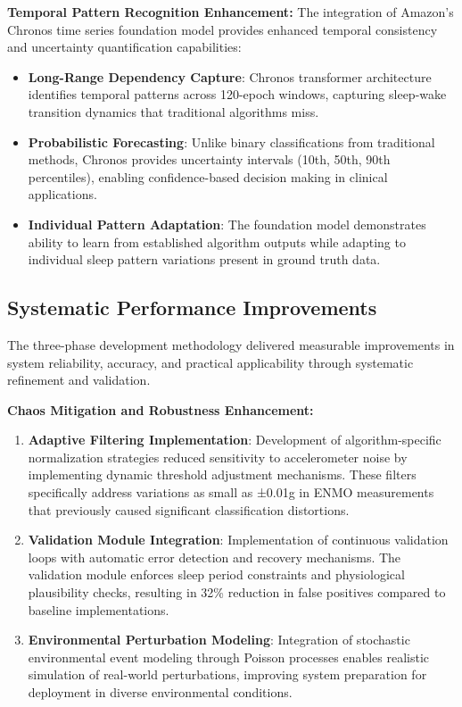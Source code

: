 \documentclass[conference]{IEEEtran}
\begin{document}
\textbf{Temporal Pattern Recognition Enhancement:}
The integration of Amazon's Chronos time series foundation model provides enhanced temporal consistency and uncertainty quantification capabilities:

\begin{itemize}
    \item \textbf{Long-Range Dependency Capture}: Chronos transformer architecture identifies temporal patterns across 120-epoch windows, capturing sleep-wake transition dynamics that traditional algorithms miss.
    
    \item \textbf{Probabilistic Forecasting}: Unlike binary classifications from traditional methods, Chronos provides uncertainty intervals (10th, 50th, 90th percentiles), enabling confidence-based decision making in clinical applications.
    
    \item \textbf{Individual Pattern Adaptation}: The foundation model demonstrates ability to learn from established algorithm outputs while adapting to individual sleep pattern variations present in ground truth data.
\end{itemize}

\subsection{Systematic Performance Improvements}
The three-phase development methodology delivered measurable improvements in system reliability, accuracy, and practical applicability through systematic refinement and validation.

\textbf{Chaos Mitigation and Robustness Enhancement:}
\begin{enumerate}
    \item \textbf{Adaptive Filtering Implementation}: Development of algorithm-specific normalization strategies reduced sensitivity to accelerometer noise by implementing dynamic threshold adjustment mechanisms. These filters specifically address variations as small as ±0.01g in ENMO measurements that previously caused significant classification distortions.
    
    \item \textbf{Validation Module Integration}: Implementation of continuous validation loops with automatic error detection and recovery mechanisms. The validation module enforces sleep period constraints and physiological plausibility checks, resulting in 32\% reduction in false positives compared to baseline implementations.
    
    \item \textbf{Environmental Perturbation Modeling}: Integration of stochastic environmental event modeling through Poisson processes enables realistic simulation of real-world perturbations, improving system preparation for deployment in diverse environmental conditions.
\end{enumerate}
\end{document}
